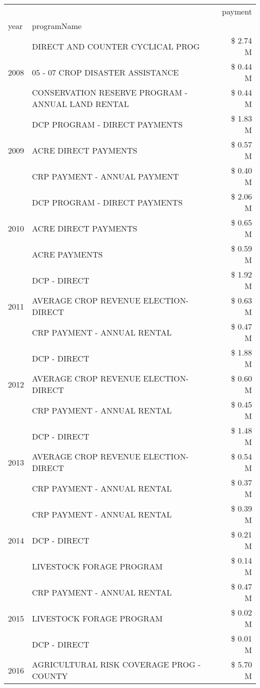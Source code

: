 \begin{tabular}{llr}
\toprule
 &  & payment \\
year & programName &  \\
\midrule
\multirow[t]{3}{*}{2008} & DIRECT AND COUNTER CYCLICAL PROG & \$ 2.74 M \\
 & 05 - 07 CROP DISASTER ASSISTANCE & \$ 0.44 M \\
 & CONSERVATION RESERVE PROGRAM - ANNUAL LAND RENTAL & \$ 0.44 M \\
\cline{1-3}
\multirow[t]{3}{*}{2009} & DCP PROGRAM - DIRECT PAYMENTS & \$ 1.83 M \\
 & ACRE DIRECT PAYMENTS & \$ 0.57 M \\
 & CRP PAYMENT - ANNUAL PAYMENT & \$ 0.40 M \\
\cline{1-3}
\multirow[t]{3}{*}{2010} & DCP PROGRAM - DIRECT PAYMENTS & \$ 2.06 M \\
 & ACRE DIRECT PAYMENTS & \$ 0.65 M \\
 & ACRE PAYMENTS & \$ 0.59 M \\
\cline{1-3}
\multirow[t]{3}{*}{2011} & DCP - DIRECT & \$ 1.92 M \\
 & AVERAGE CROP REVENUE ELECTION-DIRECT & \$ 0.63 M \\
 & CRP PAYMENT - ANNUAL RENTAL & \$ 0.47 M \\
\cline{1-3}
\multirow[t]{3}{*}{2012} & DCP - DIRECT & \$ 1.88 M \\
 & AVERAGE CROP REVENUE ELECTION-DIRECT & \$ 0.60 M \\
 & CRP PAYMENT - ANNUAL RENTAL & \$ 0.45 M \\
\cline{1-3}
\multirow[t]{3}{*}{2013} & DCP - DIRECT & \$ 1.48 M \\
 & AVERAGE CROP REVENUE ELECTION-DIRECT & \$ 0.54 M \\
 & CRP PAYMENT - ANNUAL RENTAL & \$ 0.37 M \\
\cline{1-3}
\multirow[t]{3}{*}{2014} & CRP PAYMENT - ANNUAL RENTAL & \$ 0.39 M \\
 & DCP - DIRECT & \$ 0.21 M \\
 & LIVESTOCK FORAGE PROGRAM & \$ 0.14 M \\
\cline{1-3}
\multirow[t]{3}{*}{2015} & CRP PAYMENT - ANNUAL RENTAL & \$ 0.47 M \\
 & LIVESTOCK FORAGE PROGRAM & \$ 0.02 M \\
 & DCP - DIRECT & \$ 0.01 M \\
\cline{1-3}
\multirow[t]{3}{*}{2016} & AGRICULTURAL RISK COVERAGE PROG - COUNTY      & \$ 5.70 M \\

\end{tabular}
